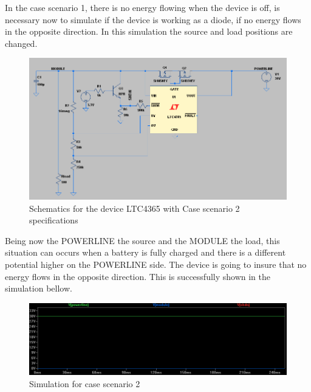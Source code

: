 In the case scenario 1, there is no energy flowing when the device is off, is necessary now to simulate if the device is working as a diode, if no energy flows in the opposite direction. In this simulation the source and load positions are changed.
\begin{figure}[H]
	\begin{centering}
		\includegraphics[width=1\textwidth]{images/tb5_LTC_simu2sc.png}
		\caption{Schematics for the device LTC4365 with Case scenario 2 specifications}
	\end{centering}
\end{figure}

Being now the POWERLINE the source and the MODULE the load, this situation can occurs when a battery is fully charged and there is a different potential higher on the POWERLINE side. The device is going to insure that no energy flows in the opposite direction. This is successfully shown in the simulation bellow.

\begin{figure}[H]
	\begin{centering}
		\includegraphics[width=1\textwidth]{images/tb5_LTC_simu2.png}
		\caption{Simulation for case scenario 2}
	\end{centering}
\end{figure}

